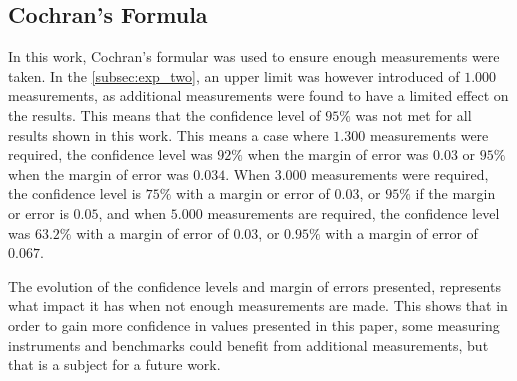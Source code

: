 \subsection{Cochran's Formula}

In this work, Cochran's formular was used to ensure enough measurements were taken. In the \cref{subsec:exp_two}, an upper limit was however introduced of $1.000$ measurements, as additional measurements were found to have a limited effect on the results. This means that the confidence level of $95\%$ was not met for all results shown in this work. This means a case where $1.300$ measurements were required, the confidence level was $92\%$ when the margin of error was $0.03$ or $95\%$ when the margin of error was $0.034$. When $3.000$ measurements were required, the confidence level is $75\%$ with a margin or error of $0.03$, or $95\%$ if the margin or error is $0.05$, and when $5.000$ measurements are required, the confidence level was $63.2\%$ with a margin of error of $0.03$, or $0.95\%$ with a margin of error of $0.067$.

The evolution of the confidence levels and margin of errors presented, represents what impact it has when not enough measurements are made. This shows that in order to gain more confidence in values presented in this paper, some measuring instruments and benchmarks could benefit from additional measurements, but that is a subject for a future work.